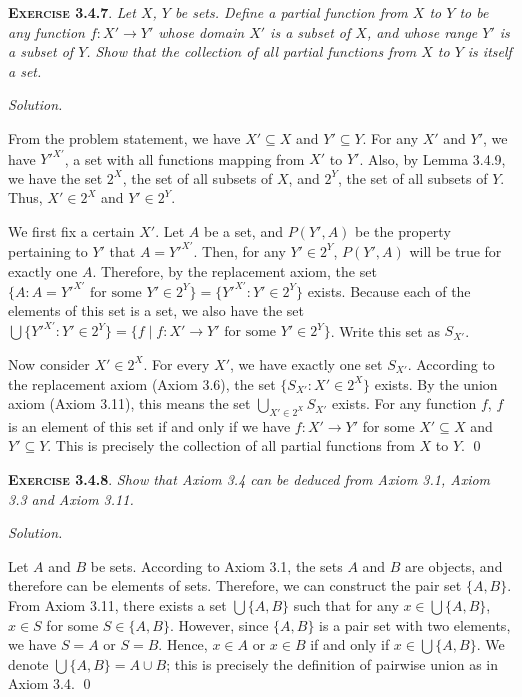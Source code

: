 \documentclass[12pt]{article}
\theoremstyle{remark}
\newenvironment{exer}[2]{
    \noindent \setlength{\parskip}{1em}%
    \textsc{\textbf{Exercise #1}}. \textit{#2} \par
    \noindent \textit{Solution.} %
}{\bigskip}
\begin{document}
\begin{exer}{3.4.7}{
    Let $X$, $Y$ be sets. Define a \emph{partial function} from $X$ to $Y$ to be any function $f : X' \to Y'$ whose domain $X'$ is a subset of $X$, and whose range $Y'$ is a subset of $Y$. 
    Show that the collection of all partial functions from $X$ to $Y$ is itself a set.
}
    From the problem statement, we have $X' \subseteq X$ and $Y' \subseteq Y$.
    For any $X'$ and $Y'$, we have $Y'^{X'}$, a set with all functions mapping from $X'$ to $Y'$.
    Also, by Lemma 3.4.9, we have the set $2^X$, the set of all subsets of $X$, and $2^Y$, the set of all subsets of $Y$.
    Thus, $X' \in 2^X$ and $Y' \in 2^Y$.

    We first fix a certain $X'$.
    Let $A$ be a set, and $P(Y', A)$ be the property pertaining to $Y'$ that $A = Y'^{X'}$.
    Then, for any $Y' \in 2^Y$, $P(Y', A)$ will be true for exactly one $A$.
    Therefore, by the replacement axiom, the set $\{ A : A = Y'^{X'} \text{ for some } Y' \in 2^Y \} = \{ Y'^{X'} : Y' \in 2^Y \}$ exists.
    Because each of the elements of this set is a set, we also have the set $\bigcup \{ Y'^{X'} : Y' \in 2^Y \} = \{ f \mid f : X' \to Y' \text{ for some } Y' \in 2^Y \}$.
    Write this set as $S_{X'}$.

    Now consider $X' \in 2^X$.
    For every $X'$, we have exactly one set $S_{X'}$.
    According to the replacement axiom (Axiom 3.6), the set $\{S_{X'} : X' \in 2^X \}$ exists.
    By the union axiom (Axiom 3.11), this means the set $\bigcup_{X' \in 2^X} S_{X'}$ exists.
    For any function $f$, $f$ is an element of this set if and only if we have $f : X' \to Y'$ for some $X' \subseteq X$ and $Y' \subseteq Y$.
    This is precisely the collection of all partial functions from $X$ to $Y$. \qed
\end{exer}


\begin{exer}{3.4.8}{Show that Axiom 3.4 can be deduced from Axiom 3.1, Axiom 3.3 and Axiom 3.11.}
    Let $A$ and $B$ be sets.
    According to Axiom 3.1, the sets $A$ and $B$ are objects, and therefore can be elements of sets.
    Therefore, we can construct the pair set $\{ A, B \}$.
    From Axiom 3.11, there exists a set $\bigcup \{ A, B \}$ such that for any $x \in \bigcup \{ A, B \}$, $x \in S$ for some $S \in \{ A, B \}$.
    However, since $\{ A, B \}$ is a pair set with two elements, we have $S = A$ or $S = B$.
    Hence, $x \in A$ or $x \in B$ if and only if $x \in \bigcup \{ A, B \}$.
    We denote $\bigcup\{ A, B \} = A \cup B$; this is precisely the definition of pairwise union as in Axiom 3.4. \qed
\end{exer}
\end{document}
